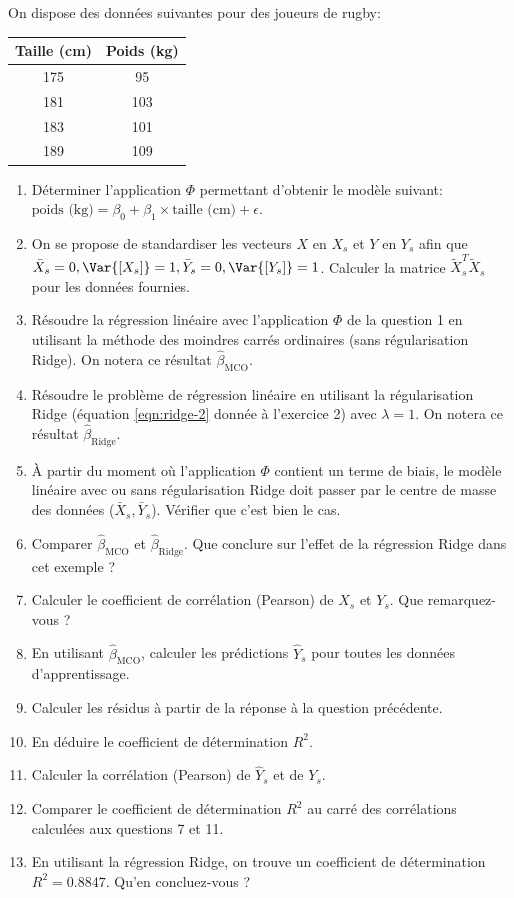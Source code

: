 \documentclass[solutions]{../exercices}
\begin{document}
\begin{exercice}

On dispose des données suivantes pour des joueurs de rugby:
\begin{center}
	\begin{tabular}{|c|c|}
		\hline
		\textbf{Taille} (cm) & \textbf{Poids} (kg) \\ \hline
		175             & 95             \\
		181             & 103            \\
		183             & 101            \\
		189             & 109            \\
		\hline
	\end{tabular}
\end{center}

\begin{enumerate}
	\item Déterminer l'application $\Phi$ permettant d'obtenir le modèle suivant: $\text{poids (kg)} = \beta_0 + \beta_1 \times \text{taille (cm)} + \epsilon$.
	\item On se propose de standardiser les vecteurs $X$ en $X_s$ et $Y$ en $Y_s$ afin que $\bar{X}_s = 0, \Var{[X_s]} = 1, \bar{Y}_s = 0, \Var{[Y_s]} = 1$. Calculer la matrice $\tilde{X}_s^T\tilde{X}_s$ pour les données fournies.
	\item Résoudre la régression linéaire avec l'application $\Phi$ de la question 1 en utilisant la méthode des moindres carrés ordinaires (sans régularisation Ridge). On notera ce résultat $\hat{\beta}_{\text{MCO}}$.
	\item Résoudre le problème de régression linéaire en utilisant la régularisation Ridge (équation \ref{eqn:ridge-2} donnée à l'exercice 2) avec $\lambda = 1$. On notera ce résultat $\hat{\beta}_{\text{Ridge}}$.
	\item \`A partir du moment où l'application $\Phi$ contient un terme de biais, le modèle linéaire avec ou sans régularisation Ridge doit passer par le centre de masse des données ($\bar{X}_s, \bar{Y}_s$). Vérifier que c'est bien le cas.
	\item Comparer $\hat{\beta}_{\text{MCO}}$ et $\hat{\beta}_{\text{Ridge}}$. Que conclure sur l'effet de la régression Ridge dans cet exemple ?
	\item Calculer le coefficient de corrélation (Pearson) de $X_s$ et $Y_s$. Que remarquez-vous ?
	\item En utilisant $\hat{\beta}_{\text{MCO}}$, calculer les prédictions $\hat{Y}_s$ pour toutes les données d'apprentissage.
	\item Calculer les résidus à partir de la réponse à la question précédente.
	\item En déduire le coefficient de détermination $R^2$.
	\item Calculer la corrélation (Pearson) de $\hat{Y}_s$ et de $Y_s$.
	\item Comparer le coefficient de détermination $R^2$ au carré des corrélations calculées aux questions 7 et 11.
	\item En utilisant la régression Ridge, on trouve un coefficient de détermination $R^2 = 0.8847$. Qu'en concluez-vous ?
\end{enumerate}
	
\end{exercice}
	
\end{document}
